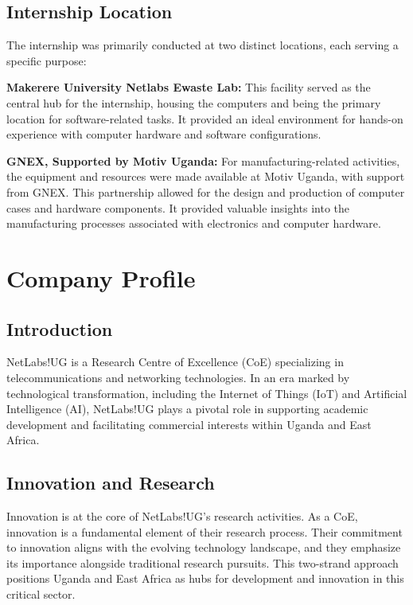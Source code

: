 \subsection{Internship Location}

The internship was primarily conducted at two distinct locations, each serving a specific purpose:

\textbf{Makerere University Netlabs Ewaste Lab:} This facility served as the central hub for the internship, housing the computers and being the primary location for software-related tasks. It provided an ideal environment for hands-on experience with computer hardware and software configurations.

\textbf{GNEX, Supported by Motiv Uganda:} For manufacturing-related activities, the equipment and resources were made available at Motiv Uganda, with support from GNEX. This partnership allowed for the design and production of computer cases and hardware components. It provided valuable insights into the manufacturing processes associated with electronics and computer hardware.

\section{Company Profile}

\subsection{Introduction}

NetLabs!UG is a Research Centre of Excellence (CoE) specializing in telecommunications and networking technologies. In an era marked by technological transformation, including the Internet of Things (IoT) and Artificial Intelligence (AI), NetLabs!UG plays a pivotal role in supporting academic development and facilitating commercial interests within Uganda and East Africa.

\subsection{Innovation and Research}

Innovation is at the core of NetLabs!UG's research activities. As a CoE, innovation is a fundamental element of their research process. Their commitment to innovation aligns with the evolving technology landscape, and they emphasize its importance alongside traditional research pursuits. This two-strand approach positions Uganda and East Africa as hubs for development and innovation in this critical sector.

